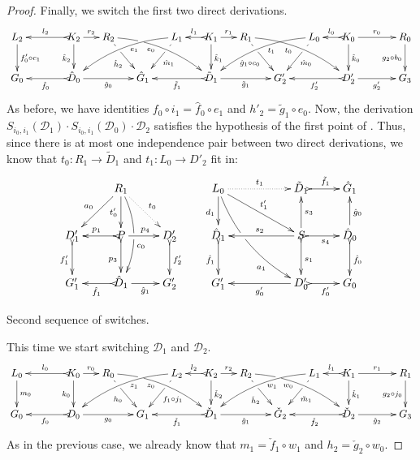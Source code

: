 \documentclass[a4paper,UKenglish,cleveref,pdftex,thm-restate,numberwithinsect,anonymous]{lipics}
\def\G{\textbf {\textup{G}}}
\newcommand{\dder}[1]{\mathscr{#1}}
\begin{document}
\begin{proof}
Finally, we switch the first two direct derivations.
	\[\xymatrix@C=15pt{L_2\ar[d]^{f'_0\circ c_1}&& K_2 \ar[d]_{\hat{k}_2}\ar@{>->}[ll]_{l_2} \ar[r]^{r_2} & R_2 \ar@/^.35cm/[drrr]_(.4){e_0}|(.285)\hole \ar[dr]|(.28)\hole_{\hat{h}_2} && L_1 \ar@/_.35cm/[dlll]^(.4){e_1} \ar[dl]|(.28)\hole^{\hat{m}_1}& K_1 \ar[d]^{\hat{k}_1}\ar@{>->}[l]_{l_1} \ar[r]^{r_1} & R_1 \ar@/^.35cm/[drrr]_(.4){t_0} \ar[dr]|(.28)\hole_{\hat{g}_1\circ c_0}   && L_0  \ar[dl]|(.28)\hole^{\hat{m}_0} \ar@/_.35cm/[dlll]^(.4){t_1}& K_0 \ar[d]^{\hat{k}_0}\ar@{>->}[l]_{l_0} \ar[rr]^{r_0} && R_0 \ar[d]_{g_2\circ b_0} \\G_0 && \ar@{>->}[ll]^{\hat{f}_0} \hat{D}_0 \ar[rr]_{\hat{g}_0}&& \hat{G}_1  && \ar@{>->}[ll]^{\tilde{f}_1} \tilde{D}_1 \ar[rr]_{\tilde{g}_1}&& G'_2 && \ar@{>->}[ll]^{f'_2} D'_2 \ar[rr]_{g'_2}&& G_3 }\]
	As before, we have identities $f_0\circ i_1=\hat{f}_0\circ e_1$ and $h'_2=\tilde{g}_1\circ e_0$. Now, the derivation $S_{i_0, i_1}(\dder{D}_1)\cdot S_{i_0, i_1}(\dder{D}_0)\cdot \dder{D}_2$ satisfies the hypothesis of the first point of . Thus, since there is at most one independence pair between two direct derivations, we know that  $t_0\colon R_1\to \tilde{D}_1$ and $t_1\colon L_0\to D'_2$  fit in:
	\[\xymatrix{&R_1 \ar[dl]_{a_0} \ar@{.>}[dr]^{t_0} \ar@/^.4cm/[dd]|\hole^(.6){c_0}\ar[d]_{t'_0}&&L_ 0\ar[d]_{d_1} \ar@/_.4cm/[ddrr]|(.41)\hole_(.7){a_1}\ar[drr]^{t'_1} \ar@{.>}[rr]^{t_1}&&\tilde{D}_1 \ar@{>->}[r]^{\tilde{f}_1}&\hat{G}_1\\ D'_1 \ar@{>->}[d]_{f'_1}&P\ar@{>->}[d]_{p_3} \ar[r]^{p_4} \ar@{>->}[l]_{p_1}&D'_2\ar@{>->}[d]^{f'_2}&\hat{D}_1 \ar@{>->}[d]_{\hat{f}_1}&&S\ar@{>->}[r]_{s_4} \ar[u]_{s_3}\ar@{>->}[d]^{s_1} \ar[ll]_{s_2} &\hat{D}_0 \ar[u]_{\hat{g}_0} \ar@{>->}[d]^{\hat{f}_0}\\G'_1&\hat{D}_1 \ar@{>->}[l]^{\hat{f}_1}\ar[r]_{\hat{g}_1}& G'_2&G'_1 && D'_0 \ar[ll]^{g'_0}  \ar@{>->}[r]_{f'_0}& G_0 }\]
	
	\smallskip \noindent Second sequence of switches.
	
	This time we start switching $\dder{D}_1$ and $\dder{D}_2$.
	\[\xymatrix@C=15pt{L_0\ar[d]^{m_0}&& K_0 \ar[d]_{k_0}\ar@{>->}[ll]_{l_0} \ar[r]^{r_0} & R_0 \ar@/^.35cm/[drrr]_(.4){z_0}|(.285)\hole \ar[dr]|(.28)\hole_{h_0} && L_2 \ar@/_.35cm/[dlll]^(.4){z_1} \ar[dl]|(.28)\hole^{f_1\circ j_1}& K_2 \ar[d]^{\check{k}_2}\ar@{>->}[l]_{l_2} \ar[r]^{r_2} & R_2 \ar[dr]|(.28)\hole_{\check{h}_2} \ar@/^.35cm/[drrr]_(.4){w_0}|(.285)\hole  && L_1 \ar@/_.35cm/[dlll]^(.4){w_1} \ar[dl]|(.28)\hole^{\check{m}_1}& K_1 \ar[d]^{\check{k}_1}\ar@{>->}[l]_{l_1} \ar[rr]^{r_1} && R_1\ar[d]_{g_2\circ j_0} \\G_0 && \ar@{>->}[ll]^{f_0} D_0 \ar[rr]_{g_0}&& G_1  && \ar@{>->}[ll]^{\check{f}_1} \check{D}_1 \ar[rr]_{\check{g}_1}&& \check{G}_2 && \ar@{>->}[ll]^{\check{f}_2} \check{D}_2 \ar[rr]_{\check{g}_2}&& G_3 }\]
	As in the previous case, we already know that $m_1=\check{f}_1\circ w_1$ and $h_2=\check{g}_2\circ w_0$.
	

\end{proof}
\end{document}

